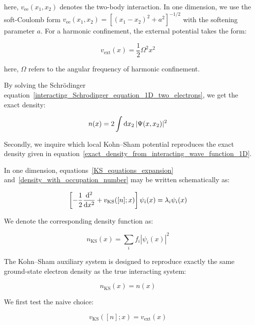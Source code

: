 here, $v_\mathrm{ee}(x_1,x_2)$ denotes the two-body interaction.
In one dimension, we use the soft-Coulomb form $v_\mathrm{ee}(x_1,x_2)=\left[(x_1-x_2)^2+a^2\right]^{-1/2}$ with the softening parameter $a$.
For a harmonic confinement, the external potential takes the form:

\begin{equation}
    v_\mathrm{ext}(x)=\frac{1}{2}\Omega^2 x^2
\label{harmonic_external_potential_1D}
\end{equation}

here, $\Omega$ refers to the angular frequency of harmonic confinement.

By solving the Schrödinger equation~\eqref{interacting_Schrodinger_equation_1D_two_electrons},
we get the exact density:

\begin{equation}
    n(x)=2\int\mathrm{d}{x_2}\,|\Psi(x,x_2)|^2
\label{exact_density_from_interacting_wave_function_1D}
\end{equation}

Secondly, we inquire which local Kohn--Sham potential reproduces the exact density given in equation~\eqref{exact_density_from_interacting_wave_function_1D}.

In one dimension, equations~\eqref{KS_equations_expansion} and~\eqref{density_with_occupation_number} may be written schematically as:

\begin{equation}
    \left[-\frac{1}{2}\frac{\mathrm{d}^2}{\mathrm{d} x^2} + v_\mathrm{KS}([n];x)\right]\psi_i(x) = \lambda_i\psi_i(x)
\label{KS_equation_1D_schematic}
\end{equation}

We denote the corresponding density function as:

\begin{equation}
    n_\mathrm{KS}(x)=\sum_i f_i |\psi_i(x)|^2
\label{KS_density_1D_schematic}
\end{equation}

The Kohn--Sham auxiliary system is designed to reproduce exactly the same ground-state electron density as the true interacting system:

\begin{equation}
    n_\mathrm{KS}(x)=n(x)
\label{KS_exact_density_matching_1D}
\end{equation}

We first test the naive choice:

\begin{equation}
    v_\mathrm{KS}([n];x)=v_\mathrm{ext}(x)
\label{naive_KS_choice_external_only_1D}
\end{equation}

